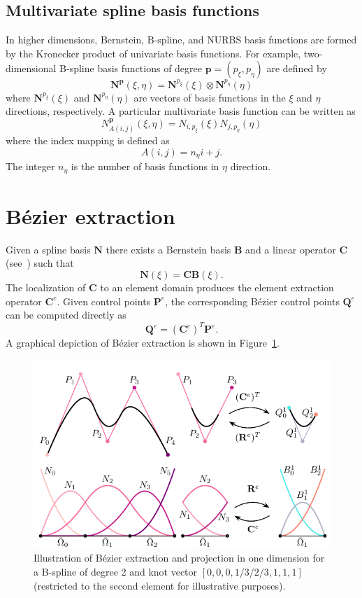 \documentclass{article}
\begin{document}
\subsection{Multivariate spline basis functions}
In higher dimensions, Bernstein, B-spline, and NURBS basis functions are formed by the Kronecker product of univariate basis functions. For example, two-dimensional B-spline basis functions of degree $\mathbf{p}=(p_\xi, p_\eta)$ are defined by
\begin{equation}
\mathbf{N}^\mathbf{p}(\xi,\eta)=\mathbf{N}^{p_\xi}(\xi)\otimes\mathbf{N}^{p_\eta}(\eta)
\end{equation}
where $\mathbf{N}^{p_\xi}(\xi)$ and $\mathbf{N}^{p_\eta}(\eta)$ are vectors of basis functions in the $\xi$ and $\eta$ directions, respectively. A particular multivariate basis function can be written as
\begin{equation}
{N}_{A(i,j)}^\mathbf{p}(\xi,\eta)={N}_{i,p_\xi}(\xi){N}_{j,p_\eta}(\eta)
\end{equation}
where the index mapping is defined as
\begin{equation}
A(i,j)=n_\eta{i}+j.
\end{equation}
The integer $n_\eta$ is the number of basis functions in $\eta$ direction.
\section{B\'{e}zier extraction}
\label{sec:extraction}
Given a spline basis $\mathbf{N}$ there exists a Bernstein basis $\mathbf{B}$ and a linear operator $\mathbf{C}$ (see~\cite{borden_isogeometric_2011}) such that
\begin{equation}
\mathbf{N}(\xi)=\mathbf{C}\mathbf{B}(\xi).
\end{equation}
The localization of $\mathbf{C}$ to an element domain produces the element extraction operator $\mathbf{C}^e$.
Given control points $\mathbf{P}^e$, the corresponding B\'ezier control points $\mathbf{Q}^e$ can be computed directly as
\begin{equation}
\mathbf{Q}^e=(\mathbf{C}^e)^T\mathbf{P}^e.
\end{equation}
A graphical depiction of B\'{e}zier extraction is shown in Figure~\ref{fig:extraction_and_projection}.

\begin{figure}
  \centering
  \includegraphics[width=.6\linewidth]{elements_global.pdf}
  \caption{Illustration of B\'ezier extraction and projection in one dimension for a B-spline of degree 2 and knot vector $[0,0,0,1/3/2/3,1,1,1]$ (restricted to the second element for illustrative purposes).}
    \label{fig:extraction_and_projection}
\end{figure}
\end{document}
